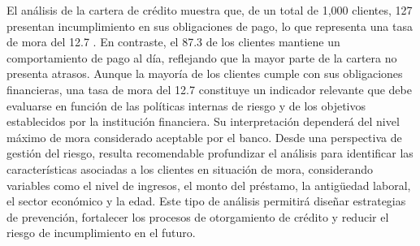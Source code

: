 El análisis de la cartera de crédito muestra que, de un total de 1,000 clientes, 127 presentan incumplimiento en sus obligaciones de pago, lo que representa una tasa de mora del
12.7%
. En contraste, el
87.3%
de los clientes mantiene un comportamiento de pago al día, reflejando que la mayor parte de la cartera no presenta atrasos.
Aunque la mayoría de los clientes cumple con sus obligaciones financieras, una tasa de mora del
12.7%
constituye un indicador relevante que debe evaluarse en función de las políticas internas de riesgo y de los objetivos establecidos por la institución financiera. Su interpretación dependerá del nivel máximo de mora considerado aceptable por el banco.
Desde una perspectiva de gestión del riesgo, resulta recomendable profundizar el análisis para identificar las características asociadas a los clientes en situación de mora, considerando variables como el nivel de ingresos, el monto del préstamo, la antigüedad laboral, el sector económico y la edad. Este tipo de análisis permitirá diseñar estrategias de prevención, fortalecer los procesos de otorgamiento de crédito y reducir el riesgo de incumplimiento en el futuro.